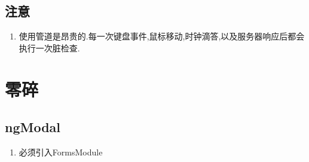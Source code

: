 \documentclass{article}
\begin{document}
\subsection{注意}
\begin{enumerate}
	\item 使用管道是昂贵的.每一次键盘事件,鼠标移动,时钟滴答,以及服务器响应后都会执行一次脏检查.
\end{enumerate}
\section{零碎}
\subsection{ngModal}
\begin{enumerate}
\item 必须引入FormsModule
\end{enumerate}
\end{document}
